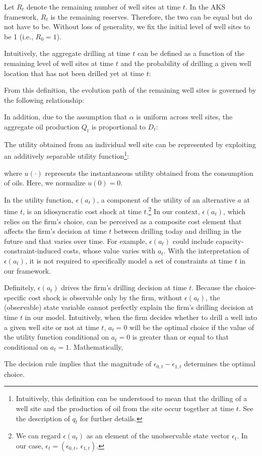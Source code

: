 Let $R_{t}$ denote the remaining number of well sites at time $t$. In the AKS framework, $R_{t}$ is the remaining reserves. Therefore, the two can be equal but do not have to be. Without loss of generality, we fix the initial level of well sites to be 1 (i.e., $R_{0} = 1$).

Intuitively, the aggregate drilling at time $t$ can be defined as a function of the remaining level of well sites at time $t$ and the probability of drilling a given well location that has not been drilled yet at time $t$:

From this definition, the evolution path of the remaining well sites is governed by the following relationship:

In addition, due to the assumption that $\alpha$ is uniform across well sites, the aggregate oil production $Q_{t}$ is proportional to $D_{t}$:


The utility obtained from an individual well site can be represented by exploiting an additively separable utility function\footnote{Intuitively, this definition can be understood to mean that the drilling of a well site and the production of oil from the site occur together at time $t$. See the description of $q_{t}$ for further details.}:

where $u(\cdot)$ represents the instantaneous utility obtained from the consumption of oils. Here, we normalize $u(0) = 0$.

In the utility function, $\epsilon(a_{t})$, a component of the utility of an alternative $a$ at time $t$, is an idiosyncratic cost shock at time $t$.\footnote{We can regard $\epsilon(a_{t})$ as an element of the unobservable state vector $\epsilon_{t}$. In our case, $\epsilon_{t} = ( \epsilon_{0, t}, \ \epsilon_{1, t} )$.} In our context, $\epsilon(a_{t})$, which relies on the firm's choice, can be perceived as a composite cost element that affects the firm's decision at time $t$ between drilling today and drilling in the future and that varies over time. For example, $\epsilon(a_{t})$ could include capacity-constraint-induced costs, whose value varies with $a_{t}$. With the interpretation of $\epsilon(a_{t})$, it is not required to specifically model a set of constraints at time $t$ in our framework. 

Definitely, $\epsilon(a_{t})$ drives the firm's drilling decision at time $t$. Because the choice-specific cost shock is observable only by the firm, without $\epsilon(a_{t})$, the (observable) state variable cannot perfectly explain the firm's drilling decision at time $t$ in our model. Intuitively, when the firm decides whether to drill a well into a given well site or not at time $t$, $a_{t} = 0$ will be the optimal choice if the value of the utility function conditional on $a_{t} = 0$ is greater than or equal to that conditional on $a_{t} = 1$. Mathematically, 

The decision rule implies that the magnitude of $\epsilon_{0, t} - \epsilon_{1, t}$ determines the optimal choice. 

